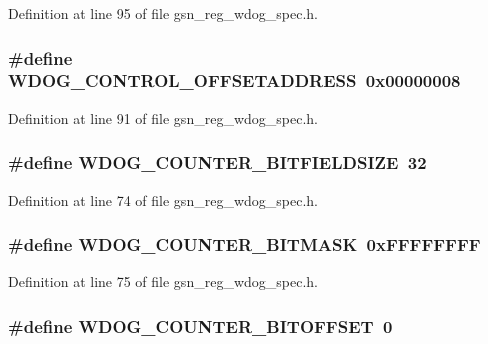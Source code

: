 Definition at line 95 of file gsn\_\-reg\_\-wdog\_\-spec.h.

\hypertarget{a00577_ad266a7f3003992dc2d46c0987ab28621}{
\subsubsection[{WDOG\_\-CONTROL\_\-OFFSETADDRESS}]{\setlength{\rightskip}{0pt plus 5cm}\#define WDOG\_\-CONTROL\_\-OFFSETADDRESS~0x00000008}}
\label{a00577_ad266a7f3003992dc2d46c0987ab28621}


Definition at line 91 of file gsn\_\-reg\_\-wdog\_\-spec.h.

\hypertarget{a00577_a5f82ed8869f21a6dba34c02b54a3704e}{
\subsubsection[{WDOG\_\-COUNTER\_\-BITFIELDSIZE}]{\setlength{\rightskip}{0pt plus 5cm}\#define WDOG\_\-COUNTER\_\-BITFIELDSIZE~32}}
\label{a00577_a5f82ed8869f21a6dba34c02b54a3704e}


Definition at line 74 of file gsn\_\-reg\_\-wdog\_\-spec.h.

\hypertarget{a00577_a7ecbbd0b3bf737926002c3141ac94a14}{
\subsubsection[{WDOG\_\-COUNTER\_\-BITMASK}]{\setlength{\rightskip}{0pt plus 5cm}\#define WDOG\_\-COUNTER\_\-BITMASK~0xFFFFFFFF}}
\label{a00577_a7ecbbd0b3bf737926002c3141ac94a14}


Definition at line 75 of file gsn\_\-reg\_\-wdog\_\-spec.h.

\hypertarget{a00577_a63044e075be43215e7fb4287d48bbc9d}{
\subsubsection[{WDOG\_\-COUNTER\_\-BITOFFSET}]{\setlength{\rightskip}{0pt plus 5cm}\#define WDOG\_\-COUNTER\_\-BITOFFSET~0}}
\label{a00577_a63044e075be43215e7fb4287d48bbc9d}


